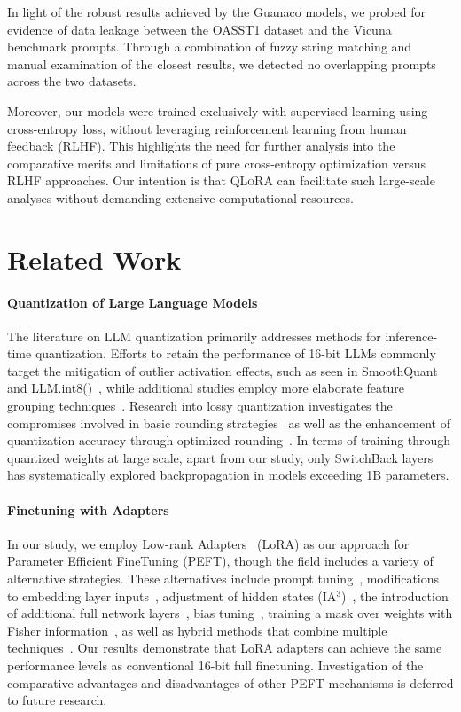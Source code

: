 In light of the robust results achieved by the {Guanaco} models, we probed for evidence of data leakage between the OASST1 dataset and the Vicuna benchmark prompts. Through a combination of fuzzy string matching and manual examination of the closest results, we detected no overlapping prompts across the two datasets.

Moreover, our models were trained exclusively with supervised learning using cross-entropy loss, without leveraging reinforcement learning from human feedback (RLHF). This highlights the need for further analysis into the comparative merits and limitations of pure cross-entropy optimization versus RLHF approaches. Our intention is that \textsc{QLoRA} can facilitate such large-scale analyses without demanding extensive computational resources.

\section{Related Work}

\paragraph{Quantization of Large Language Models} The literature on LLM quantization primarily addresses methods for inference-time quantization. Efforts to retain the performance of 16-bit LLMs commonly target the mitigation of outlier activation effects, such as seen in SmoothQuant~\citep{xiao2022smoothquant} and LLM.int8()~\citep{dettmers2022llm}, while additional studies employ more elaborate feature grouping techniques~\citep{park2022nuqmm, yao2022zeroquant}. Research into lossy quantization investigates the compromises involved in basic rounding strategies~\citep{dettmers2022case,zeng2022glm,pope2022efficiently} as well as the enhancement of quantization accuracy through optimized rounding~\citep{frantar2022gptq}. In terms of training through quantized weights at large scale, apart from our study, only SwitchBack layers~\citep{wortsman2023stable} has systematically explored backpropagation in models exceeding 1B parameters.

\paragraph{Finetuning with Adapters} In our study, we employ Low-rank Adapters~\citep{hu2021lora} (LoRA) as our approach for Parameter Efficient FineTuning (PEFT), though the field includes a variety of alternative strategies. These alternatives include prompt tuning~\citep{qin2021learning,lester2021power,li2021prefix}, modifications to embedding layer inputs~\citep{an2022input}, adjustment of hidden states (IA$^3$)~\citep{liu2022few}, the introduction of additional full network layers~\citep{houlsby2019parameter}, bias tuning~\citep{zaken2021bitfit}, training a mask over weights with Fisher information~\citep{sung2021training}, as well as hybrid methods that combine multiple techniques~\citep{henderson2021compacter}. Our results demonstrate that LoRA adapters can achieve the same performance levels as conventional 16-bit full finetuning. Investigation of the comparative advantages and disadvantages of other PEFT mechanisms is deferred to future research.

